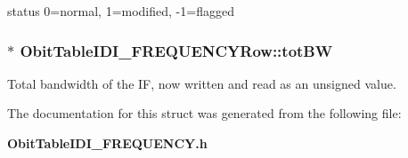 status 0=normal, 1=modified, -1=flagged 

\subsubsection{$\ast$ {\bf Obit\-Table\-IDI\_\-FREQUENCYRow::tot\-BW}}\label{structObitTableIDI__FREQUENCYRow_o9}


Total bandwidth of the IF, now written and read as an unsigned value. 



The documentation for this struct was generated from the following file:\begin{CompactItemize}
\item 
{\bf Obit\-Table\-IDI\_\-FREQUENCY.h}\end{CompactItemize}
